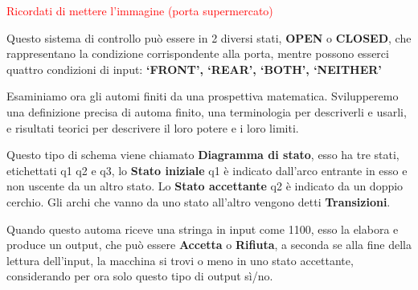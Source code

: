 \documentclass{article}
\begin{document}
\begin{center}
    \textcolor{red}{Ricordati di mettere l'immagine (porta supermercato)}
\end{center}

Questo sistema di controllo può essere in 2 diversi stati, \textbf{OPEN} o
\textbf{CLOSED}, che rappresentano la condizione corrispondente alla porta,
mentre possono esserci quattro condizioni di input: \textbf{`FRONT', `REAR',
`BOTH', `NEITHER'}

\begin{center}    
\end{center} 

Esaminiamo ora gli automi finiti da una prospettiva matematica. Svilupperemo una
definizione precisa di automa finito, una terminologia per descriverli e usarli,
e risultati teorici per descrivere il loro potere e i loro limiti.

\begin{center}
\end{center}

Questo tipo di schema viene chiamato \textbf{Diagramma di stato}, esso ha tre
stati, etichettati q1 q2 e q3, lo \textbf{Stato iniziale} q1 è indicato
dall'arco entrante in esso e non uscente da un altro stato. Lo \textbf{Stato
accettante} q2 è indicato da un doppio cerchio. Gli archi che vanno da uno stato
all'altro vengono detti \textbf{Transizioni}.

Quando questo automa riceve una stringa in input come 1100, esso la elabora e
produce un output, che può essere \textbf{Accetta} o \textbf{Rifiuta}, a seconda
se alla fine della lettura dell'input, la macchina si trovi o meno in uno stato
accettante, considerando per ora solo questo tipo di output sì/no.
\end{document}
